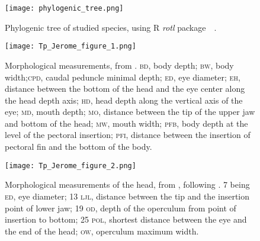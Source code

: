 
\renewcommand\thefigure{\thesection.\arabic{figure}}
\setcounter{figure}{0}

\begin{figure} [!htbp]
	\begin{center}
		\texttt{[image: phylogenic\_tree.png]}
	\end{center}
	\caption[Phylogenic tree of studied species]{Phylogenic tree of studied species, using R \emph{rotl} package~\citep{opentreeoflife2019}~.}
	\label{fig:phylotree}
\end{figure}


\begin{figure} [!htbp]
	\begin{center}
		\texttt{[image: Tp\_Jerome\_figure\_1.png]}
		\caption[Body morphological measurements]{Morphological measurements, from \citet{albouy2011}. \textsc{bd}, body depth; \textsc{bw}, body width;\textsc{cpd}, caudal peduncle minimal depth; \textsc{ed}, eye diameter; \textsc{eh}, distance between the bottom of the head and the eye center along the head depth axis; \textsc{hd}, head depth along the vertical axis of the eye; \textsc{md}, mouth depth; \textsc{mo}, distance between the tip of the upper jaw and bottom of the head; \textsc{mw}, mouth width; \textsc{pfb}, body depth at the level of the pectoral insertion; \textsc{pfi}, distance between the insertion of pectoral fin and the bottom of the body.}
	\label{fig:full_body}
	\end{center}
\end{figure}


\begin{figure} [!htbp]
	\begin{center}
		\texttt{[image: Tp\_Jerome\_figure\_2.png]}
		\caption[Head morphological measurements]{Morphological measurements of the head, from \citet{diderich2006}, following \citet{sibbing2000}. 7 being \textsc{ed}, eye diameter; 13 \textsc{ljl}, distance between the tip and the insertion point of lower jaw; 19 \textsc{od}, depth of the operculum from point of insertion to bottom; 25 \textsc{pol}, shortest distance between the eye and the end of the head; \textsc{ow}, operculum maximum width.}
	\label{fig:head}
	\end{center}
	
\end{figure}


